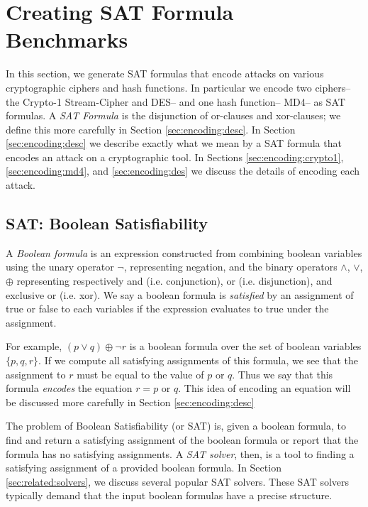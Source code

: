 \section{Creating SAT Formula Benchmarks}
\label{sec:encoding}

In this section, we generate SAT formulas that encode attacks on various cryptographic ciphers and hash functions. In particular we encode two ciphers-- the Crypto-1 Stream-Cipher and DES-- and one hash function-- MD4-- as SAT formulas. A \emph{SAT Formula} is the disjunction of or-clauses and xor-clauses; we define this more carefully in Section \ref{sec:encoding:desc}. In Section \ref{sec:encoding:desc} we describe exactly what we mean by a SAT formula that encodes an attack on a cryptographic tool. In Sections \ref{sec:encoding:crypto1}, \ref{sec:encoding:md4}, and \ref{sec:encoding:des} we discuss the details of encoding each attack.

\subsection{SAT: Boolean Satisfiability}
\label{sec:encoding:sat}

A \emph{Boolean formula} is an expression constructed from combining boolean variables using the unary operator $\neg$, representing negation, and the binary operators $\land$, $\lor$, $\oplus$ representing respectively and (i.e. conjunction), or (i.e. disjunction), and exclusive or (i.e. xor). We say a boolean formula is \emph{satisfied} by an assignment of true or false to each variables if the expression evaluates to true under the assignment.

For example, $(p \lor q) \oplus \neg r$ is a boolean formula over the set of boolean variables $\{p, q, r\}$. If we compute all satisfying assignments of this formula, we see that the assignment to $r$ must be equal to the value of $p \text{ or } q$. Thus we say that this formula \emph{encodes} the equation $r = p \text{ or } q$. This idea of encoding an equation will be discussed more carefully in Section \ref{sec:encoding:desc}

The problem of Boolean Satisfiability (or SAT) is, given a boolean formula, to find and return a satisfying assignment of the boolean formula or report that the formula has no satisfying assignments. A \emph{SAT solver}, then, is a tool to finding a satisfying assignment of a provided boolean formula. In Section \ref{sec:related:solvers}, we discuss several popular SAT solvers. These SAT solvers typically demand that the input boolean formulas have a precise structure. 


